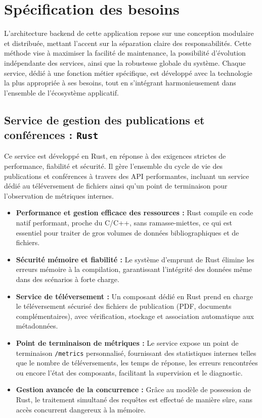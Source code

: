 \documentclass{rapportPfe}
\begin{document}
\chapter{Spécification des besoins}

L’architecture backend de cette application repose sur une conception modulaire et distribuée, mettant l’accent sur la séparation claire des responsabilités. Cette méthode vise à maximiser la facilité de maintenance, la possibilité d’évolution indépendante des services, ainsi que la robustesse globale du système. Chaque service, dédié à une fonction métier spécifique, est développé avec la technologie la plus appropriée à ses besoins, tout en s’intégrant harmonieusement dans l’ensemble de l’écosystème applicatif.

\section{Service de gestion des publications et conférences : \texttt{Rust}}

Ce service est développé en Rust, en réponse à des exigences strictes de performance, fiabilité et sécurité. Il gère l’ensemble du cycle de vie des publications et conférences à travers des API performantes, incluant un service dédié au téléversement de fichiers ainsi qu’un point de terminaison pour l’observation de métriques internes.

\begin{itemize}
    \item \textbf{Performance et gestion efficace des ressources :} Rust compile en code natif performant, proche du C/C++, sans ramasse-miettes, ce qui est essentiel pour traiter de gros volumes de données bibliographiques et de fichiers.
    \item \textbf{Sécurité mémoire et fiabilité :} Le système d’emprunt de Rust élimine les erreurs mémoire à la compilation, garantissant l’intégrité des données même dans des scénarios à forte charge.
    \item \textbf{Service de téléversement :} Un composant dédié en Rust prend en charge le téléversement sécurisé des fichiers de publication (PDF, documents complémentaires), avec vérification, stockage et association automatique aux métadonnées.
    \item \textbf{Point de terminaison de métriques :} Le service expose un point de terminaison \texttt{/metrics} personnalisé, fournissant des statistiques internes telles que le nombre de téléversements, les temps de réponse, les erreurs rencontrées ou encore l’état des composants, facilitant la supervision et le diagnostic.
    \item \textbf{Gestion avancée de la concurrence :} Grâce au modèle de possession de Rust, le traitement simultané des requêtes est effectué de manière sûre, sans accès concurrent dangereux à la mémoire.
\end{itemize}
\end{document}
